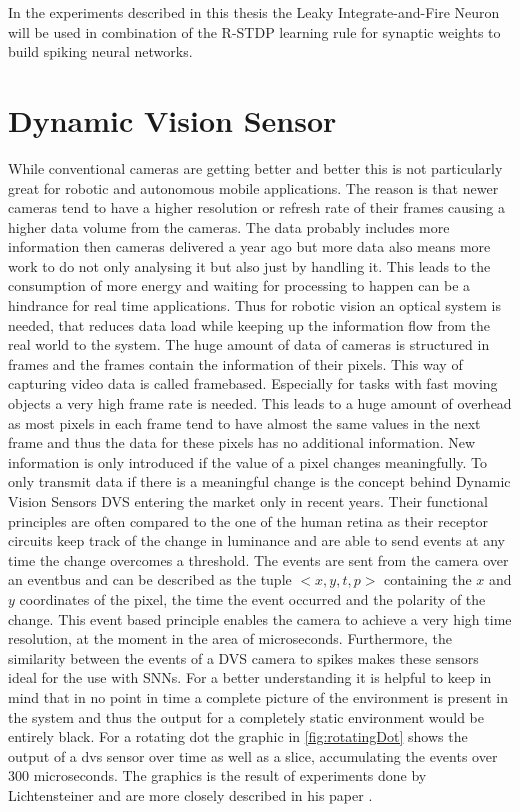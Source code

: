In the experiments described in this thesis the Leaky Integrate-and-Fire Neuron will be used in combination of the R-STDP learning rule for synaptic weights to build spiking neural networks.

\section{Dynamic Vision Sensor}
While conventional cameras are getting better and better this is not particularly great for robotic and autonomous mobile applications. The reason is that newer cameras tend to have a higher resolution or refresh rate of their frames causing a higher data volume from the cameras. The data probably includes more information then cameras delivered a year ago but more data also means more work to do not only analysing it but also just by handling it. This leads to the consumption of more energy and waiting for processing to happen can be a hindrance for real time applications. Thus for robotic vision an optical system is needed, that reduces data load while keeping up the information flow from the real world to the system. The huge amount of data of cameras is structured in frames and the frames contain the information of their pixels. This way of capturing video data is called framebased. 
Especially for tasks with fast moving objects a very high frame rate is needed. This leads to a huge amount of overhead as most pixels in each frame tend to have almost the same values in the next frame and thus the data for these pixels has no additional information. New information is only introduced if the value of a pixel changes meaningfully.
\newline
To only transmit data if there is a meaningful change is the concept behind Dynamic Vision Sensors DVS entering the market only in recent years. Their functional principles are often compared to the one of the human retina as their receptor circuits keep track of the change in luminance and are able to send events at any time the change overcomes a threshold. The events are sent from the camera over an eventbus and can be described as the tuple $<x,y,t,p>$ containing the $x$ and $y$ coordinates of the pixel, the time the event occurred and the polarity of the change. This event based principle enables the camera to achieve a very high time resolution, at the moment in the area of microseconds. Furthermore, the similarity between the events of a DVS camera to spikes makes these sensors ideal for the use with SNNs.
For a better understanding it is helpful to keep in mind that in no point in time a complete picture of the environment is present in the system and thus the output for a completely static environment would be entirely black. For a rotating dot the graphic in \autoref{fig:rotatingDot} shows the output of a dvs sensor over time as well as a slice, accumulating the events over 300 microseconds. The graphics is the result of experiments done by Lichtensteiner and are more closely described in his paper \cite{lichtsteiner2008128}.


